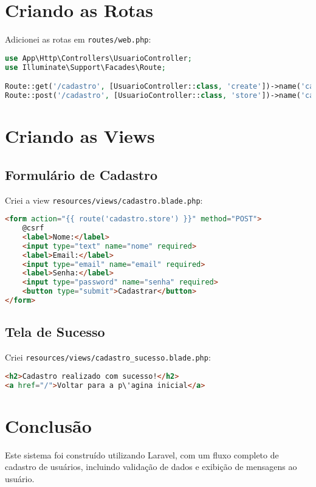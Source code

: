 \documentclass{article}
\begin{document}
\section{Criando as Rotas}

Adicionei as rotas em \texttt{routes/web.php}:

\begin{lstlisting}[language=PHP]
use App\Http\Controllers\UsuarioController;
use Illuminate\Support\Facades\Route;

Route::get('/cadastro', [UsuarioController::class, 'create'])->name('cadastro');
Route::post('/cadastro', [UsuarioController::class, 'store'])->name('cadastro.store');
\end{lstlisting}

\section{Criando as Views}

\subsection{Formulário de Cadastro}
Criei a view \texttt{resources/views/cadastro.blade.php}:

\begin{lstlisting}[language=HTML]
<form action="{{ route('cadastro.store') }}" method="POST">
    @csrf
    <label>Nome:</label>
    <input type="text" name="nome" required>
    <label>Email:</label>
    <input type="email" name="email" required>
    <label>Senha:</label>
    <input type="password" name="senha" required>
    <button type="submit">Cadastrar</button>
</form>
\end{lstlisting}

\subsection{Tela de Sucesso}
Criei \texttt{resources/views/cadastro\_sucesso.blade.php}:

\begin{lstlisting}[language=HTML]
<h2>Cadastro realizado com sucesso!</h2>
<a href="/">Voltar para a p\'agina inicial</a>
\end{lstlisting}

\section{Conclusão}
Este sistema foi construído utilizando Laravel, com um fluxo completo de cadastro de usuários, incluindo validação de dados e exibição de mensagens ao usuário. 
\end{document}
